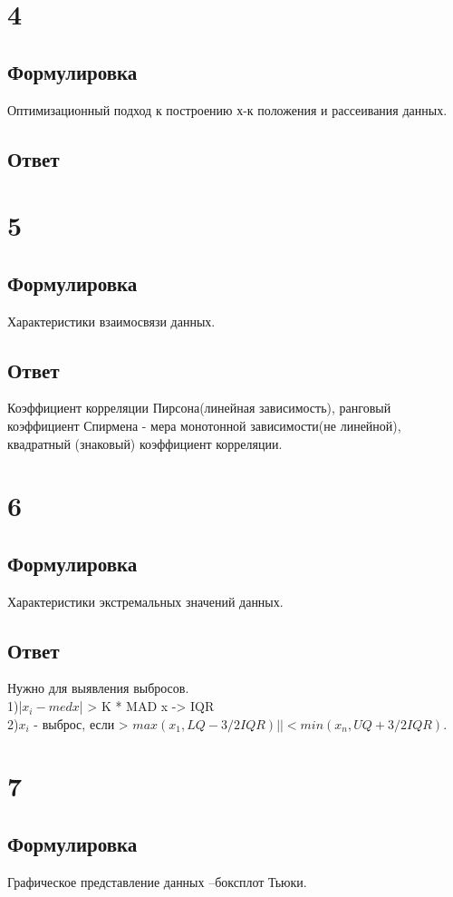 \documentclass[a4]{article}
\begin{document}
	\section{4}
	\subsection*{Формулировка}
	Оптимизационный подход к построению х-к положения и рассеивания данных.
	\subsection*{Ответ}
	
	
	
	\section{5}
	\subsection*{Формулировка}
	Характеристики взаимосвязи данных.
	\subsection*{Ответ}
	Коэффициент корреляции Пирсона(линейная зависимость), ранговый коэффициент Спирмена - мера монотонной зависимости(не линейной), квадратный (знаковый) коэффициент корреляции.
	
	\section{6}
	\subsection*{Формулировка}
	Характеристики экстремальных значений данных.
	\subsection*{Ответ}
	Нужно для выявления выбросов.\\
	1)|$x_i - med x$| > K * MAD x -> IQR\\
	2)$x_i$ - выброс, если > $max(x_1, LQ - 3/2 IQR) || < min(x_n, UQ + 3/2 IQR)$.
	
	
	\section{7}
	\subsection*{Формулировка}
	Графическое представление данных –боксплот Тьюки.
\end{document}
